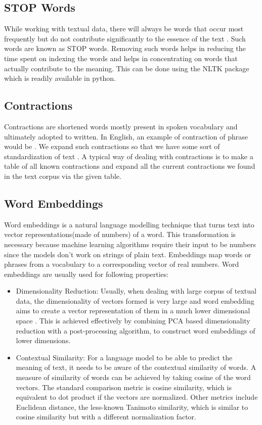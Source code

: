 \subsection{STOP Words}
While working with textual data, there will always be words that occur most frequently but do not contribute significantly to the essence of the text \cite{Manning:2008:IIR:1394399}. Such words are known as STOP words. Removing such words helps in reducing the time spent on indexing the words and helps in concentrating on words that actually contribute to the meaning. This can be done using the NLTK package which is readily available in python. \cite{Loper:2002:NNL:1118108.1118117}
\subsection{Contractions}
 Contractions are shortened words mostly present in spoken vocabulary and ultimately adopted to written. In English, an example of contraction of phrase  would be . We expand such contractions so that we have some sort of standardization of text \cite{Sarkar:2016:TAP:3086768}. A typical way of dealing with contractions is to make a table of all known contractions and expand all the current contractions we found in the text corpus via the given table. 
 \subsection{Word Embeddings}
 Word embeddings is a natural language modelling technique that turns text into vector representations(made of numbers) of a word. This transformation is necessary because machine learning algorithms require their input to be numbers since the models don't work on strings of plain text. Embeddings map words or phrases from a vocabulary to a corresponding vector of real numbers. Word embeddings are usually used for following properties:
 \begin{itemize}
     \item Dimensionality Reduction: Usually, when dealing with large corpus of textual data, the dimensionality of vectors formed is very large and word embedding aims to create a vector representation of them in a much lower dimensional space \cite{pennington2014glove}. This is achieved effectively by combining PCA based dimensionality reduction with a post-processing algorithm, to construct word embeddings of lower dimensions.\cite{DBLP:journals/corr/abs-1708-03629}
     \item Contextual Similarity: For a language model to be able to predict the meaning of text, it needs to be aware of the contextual similarity of words.\cite{DBLP:journals/corr/MikolovSCCD13}
     A measure of similarity of words can be achieved by taking cosine of the word vectors. The standard comparison metric is cosine similarity, which is equivalent to dot product if the vectors are normalized. Other metrics include Euclidean distance, the less-known Tanimoto similarity, which is similar to cosine similarity but with a different normalization factor.\cite{Thesis}
 \end{itemize}

